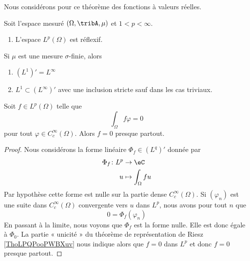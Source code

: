 \begin{theorem}
    Nous considérons pour ce théorème des fonctions à valeurs réelles.

    Soit l'espace mesuré \( (\Omega,\tribA,\mu)\) et \( 1<p<\infty\).
    \begin{enumerate}
        \item
            L'espace \( L^p(\Omega)\) est réflexif.
    \end{enumerate}
    Si \( \mu\) est une mesure \( \sigma\)-finie, alors
    \begin{enumerate}
        \item
            \( (L^1)'=L^{\infty}\)
        \item
            \( L^1\subset (L^{\infty})' \) avec une inclusion stricte sauf dans les cas triviaux.
    \end{enumerate}
\end{theorem}

\begin{proposition} \label{PropUKLZZZh}
    Soit \( f\in L^p(\Omega)\) telle que
    \begin{equation}
        \int_{\Omega}f\varphi=0
    \end{equation}
    pour tout \( \varphi\in C^{\infty}_c(\Omega)\). Alors \( f=0\) presque partout.
\end{proposition}

\begin{proof}
    Nous considérons la forme linéaire \( \Phi_f\in (L^q)'\) donnée par
    \begin{equation}
        \begin{aligned}
            \Phi_f\colon L^p&\to \eC \\
            u&\mapsto \int_{\Omega}fu
        \end{aligned}
    \end{equation}
    Par hypothèse cette forme est nulle sur la partie dense \(  C^{\infty}_c(\Omega)\). Si \( (\varphi_n)\) est une suite dans \(  C^{\infty}_c(\Omega)\) convergente vers \( u\) dans \( L^p\), nous avons pour tout \( n\) que
    \begin{equation}
        0=\Phi_f(\varphi_n)
    \end{equation}
    En passant à la limite, nous voyons que \( \Phi_f\) est la forme nulle. Elle est donc égale à \( \Phi_0\). La partie « unicité » du théorème de représentation de Riesz \ref{ThoLPQPooPWBXuv} nous indique alors que \( f=0\) dans \( L^p\) et donc \( f=0\) presque partout.
\end{proof}

